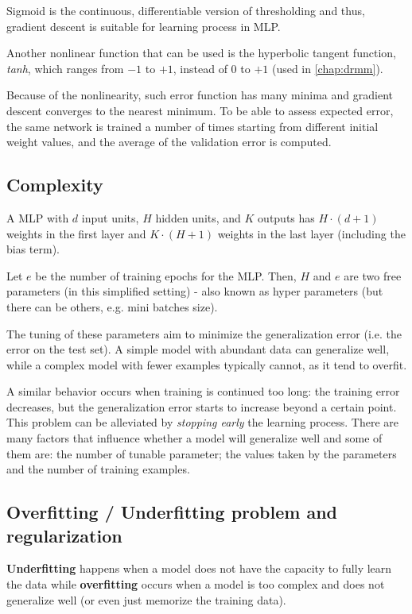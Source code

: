 Sigmoid is the continuous, differentiable version of thresholding and thus, gradient descent is suitable for learning process in MLP.

Another nonlinear function that can be used is the hyperbolic tangent function, \textit{tanh}, which ranges from $-1$ to $+1$, instead of $0$ to $+1$ (used in \ref{chap:drmm}).

Because of the nonlinearity, such error function has many minima and gradient descent converges to the nearest minimum. To be able to assess expected  error,  the  same  network  is  trained  a  number  of  times  starting from different initial weight values, and the average of the validation error is computed.

\subsection{Complexity}

A MLP with $d$ input units, $H$ hidden units, and $K$ outputs has $H \cdot (d+1)$ weights in the first layer and $K \cdot (H+1)$ weights in the last layer (including the bias term).

Let $e$ be the number of training epochs for the MLP. Then, $H$ and $e$ are two free parameters (in this simplified setting) - also known as hyper parameters (but there can be others, e.g. mini batches size).

The tuning of these parameters aim to minimize the generalization error (i.e. the error on the test set).
A simple model with abundant data can generalize well, while a complex model with fewer examples typically cannot, as it tend to overfit.

A similar behavior occurs when training is continued  too long: the training error decreases, but the generalization error starts to increase beyond a certain point. This problem can be alleviated by \textit{stopping early} the learning process.
There are many factors that influence whether a model will generalize well and some of them are: the number of tunable parameter; the values taken by the parameters and the number of training examples.

\subsection{Overfitting / Underfitting problem and regularization}

\textbf{Underfitting} happens when a model does not have the capacity to fully learn the data while \textbf{overfitting} occurs when a model is too complex and does not generalize well (or even just memorize the training data).


